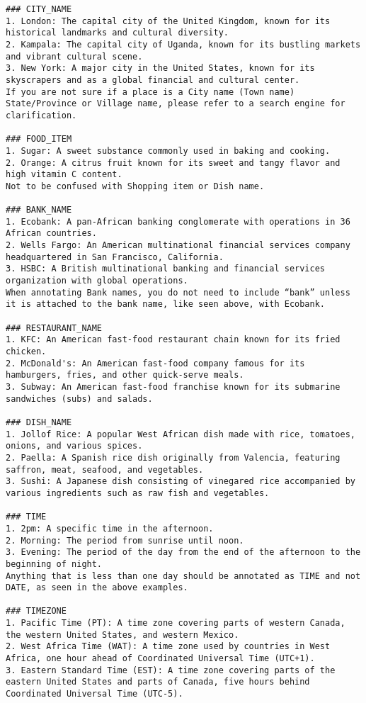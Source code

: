 \begin{verbatim}
### CITY_NAME
1. London: The capital city of the United Kingdom, known for its historical landmarks and cultural diversity.
2. Kampala: The capital city of Uganda, known for its bustling markets and vibrant cultural scene.
3. New York: A major city in the United States, known for its skyscrapers and as a global financial and cultural center.
If you are not sure if a place is a City name (Town name) State/Province or Village name, please refer to a search engine for clarification.

### FOOD_ITEM
1. Sugar: A sweet substance commonly used in baking and cooking.
2. Orange: A citrus fruit known for its sweet and tangy flavor and high vitamin C content.
Not to be confused with Shopping item or Dish name.

### BANK_NAME
1. Ecobank: A pan-African banking conglomerate with operations in 36 African countries.
2. Wells Fargo: An American multinational financial services company headquartered in San Francisco, California.
3. HSBC: A British multinational banking and financial services organization with global operations.
When annotating Bank names, you do not need to include “bank” unless it is attached to the bank name, like seen above, with Ecobank.

### RESTAURANT_NAME
1. KFC: An American fast-food restaurant chain known for its fried chicken.
2. McDonald's: An American fast-food company famous for its hamburgers, fries, and other quick-serve meals.
3. Subway: An American fast-food franchise known for its submarine sandwiches (subs) and salads.

### DISH_NAME
1. Jollof Rice: A popular West African dish made with rice, tomatoes, onions, and various spices.
2. Paella: A Spanish rice dish originally from Valencia, featuring saffron, meat, seafood, and vegetables.
3. Sushi: A Japanese dish consisting of vinegared rice accompanied by various ingredients such as raw fish and vegetables.

### TIME
1. 2pm: A specific time in the afternoon.
2. Morning: The period from sunrise until noon.
3. Evening: The period of the day from the end of the afternoon to the beginning of night.
Anything that is less than one day should be annotated as TIME and not DATE, as seen in the above examples.

### TIMEZONE
1. Pacific Time (PT): A time zone covering parts of western Canada, the western United States, and western Mexico.
2. West Africa Time (WAT): A time zone used by countries in West Africa, one hour ahead of Coordinated Universal Time (UTC+1).
3. Eastern Standard Time (EST): A time zone covering parts of the eastern United States and parts of Canada, five hours behind Coordinated Universal Time (UTC-5).


\end{verbatim}
